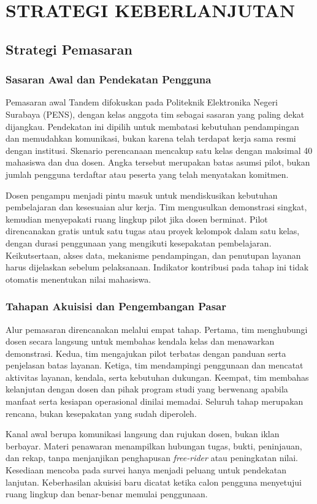 \documentclass[12pt,a4paper,oneside]{report}
\begin{document}
\chapter{STRATEGI KEBERLANJUTAN}
\section{Strategi Pemasaran}
\subsection{Sasaran Awal dan Pendekatan Pengguna}
Pemasaran awal Tandem difokuskan pada Politeknik Elektronika Negeri Surabaya (PENS), dengan kelas anggota tim sebagai sasaran yang paling dekat dijangkau. Pendekatan ini dipilih untuk membatasi kebutuhan pendampingan dan memudahkan komunikasi, bukan karena telah terdapat kerja sama resmi dengan institusi. Skenario perencanaan mencakup satu kelas dengan maksimal 40 mahasiswa dan dua dosen. Angka tersebut merupakan batas asumsi pilot, bukan jumlah pengguna terdaftar atau peserta yang telah menyatakan komitmen.

Dosen pengampu menjadi pintu masuk untuk mendiskusikan kebutuhan pembelajaran dan kesesuaian alur kerja. Tim mengusulkan demonstrasi singkat, kemudian menyepakati ruang lingkup pilot jika dosen berminat. Pilot direncanakan gratis untuk satu tugas atau proyek kelompok dalam satu kelas, dengan durasi penggunaan yang mengikuti kesepakatan pembelajaran. Keikutsertaan, akses data, mekanisme pendampingan, dan penutupan layanan harus dijelaskan sebelum pelaksanaan. Indikator kontribusi pada tahap ini tidak otomatis menentukan nilai mahasiswa.

\subsection{Tahapan Akuisisi dan Pengembangan Pasar}
Alur pemasaran direncanakan melalui empat tahap. Pertama, tim menghubungi dosen secara langsung untuk membahas kendala kelas dan menawarkan demonstrasi. Kedua, tim mengajukan pilot terbatas dengan panduan serta penjelasan batas layanan. Ketiga, tim mendampingi penggunaan dan mencatat aktivitas layanan, kendala, serta kebutuhan dukungan. Keempat, tim membahas kelanjutan dengan dosen dan pihak program studi yang berwenang apabila manfaat serta kesiapan operasional dinilai memadai. Seluruh tahap merupakan rencana, bukan kesepakatan yang sudah diperoleh.

Kanal awal berupa komunikasi langsung dan rujukan dosen, bukan iklan berbayar. Materi penawaran menampilkan hubungan tugas, bukti, peninjauan, dan rekap, tanpa menjanjikan penghapusan \textit{free-rider} atau peningkatan nilai. Kesediaan mencoba pada survei hanya menjadi peluang untuk pendekatan lanjutan. Keberhasilan akuisisi baru dicatat ketika calon pengguna menyetujui ruang lingkup dan benar-benar memulai penggunaan.
\end{document}
